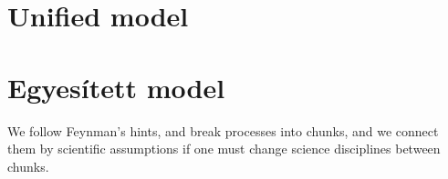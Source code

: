 
\ifx\magyar\undefined
\chapter[Unified model]{Unified model\label{ch:V2-0Modell-Unified}}
\else
\chapter[Egyesített model]{Egyesített model\label{ch:V2-0Modell-Unified}}
\fi

\iflatexml
\else
\minitoc
\fi


We follow Feynman's hints, and break processes into chunks,
and we connect them by scientific assumptions if
one must change science disciplines between chunks.


